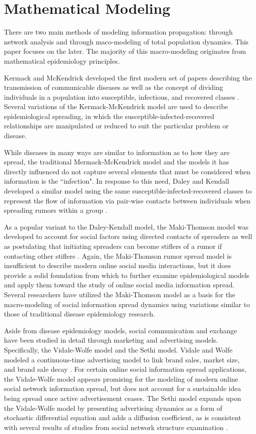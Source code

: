 \section{Mathematical Modeling}
There are two main methods of modeling information propagation: through network analysis and through maco-modeling of total population dynamics. This paper focuses on the later. The majority of this macro-modeling originates from mathematical epidemiology principles.

Kermack and McKendrick developed the first modern set of papers describing the transmission of communicable diseases as well as the concept of dividing individuals in a population into susceptible, infectious, and recovered classes \cite{kermack1932contributions}. Several variations of the Kermack-McKendrick model are used to describe epidemiological spreading, in which the susceptible-infected-recovered relationships are manipulated or reduced to suit the particular problem or disease. 

While diseases in many ways are similar to information as to how they are spread, the traditional Mermack-McKendrick model and the models it has directly influenced do not capture several elements that must be considered when information is the ``infection". In response to this need, Daley and Kendall developed a similar model using the same susceptible-infected-recovered classes to represent the flow of information via pair-wise contacts between individuals when spreading rumors within a group \cite{daley1965stochastic}. 

As a popular variant to the Daley-Kendall model, the Maki-Thomson model was developed to account for social factors using directed contacts of spreaders as well as postulating that initiating spreaders can become stiflers of a rumor if contacting other stiflers \cite{maki1973mathematical}. Again, the Maki-Thomson rumor spread model is insufficient to describe modern online social media interactions, but it does provide a solid foundation from which to further examine epidemiological models and apply them toward the study of online social media information spread. Several researchers have utilized the Maki-Thomson model as a basis for the macro-modeling of social information spread dynamics using variations similar to those of traditional disease epidemiology research.

Aside from disease epidemiology models, social communication and exchange have been studied in detail through marketing and advertising models. Specifically, the Vidale-Wolfe model and the Sethi model. Vidale and Wolfe modeled a continuous-time advertising model to link brand sales, market size, and brand sale decay \cite{vidale1957operations}. For certain online social information spread applications, the Vidale-Wolfe model appears promising for the modeling of modern online social network information spread, but does not account for a sustainable idea being spread once active advertisement ceases. The Sethi model expands upon the Vidale-Wolfe model by presenting advertising dynamics as a form of stochastic differential equation and adds a diffusion coefficient, as is consistent with several results of studies from social network structure examination \cite{sethi1973optimal}.

